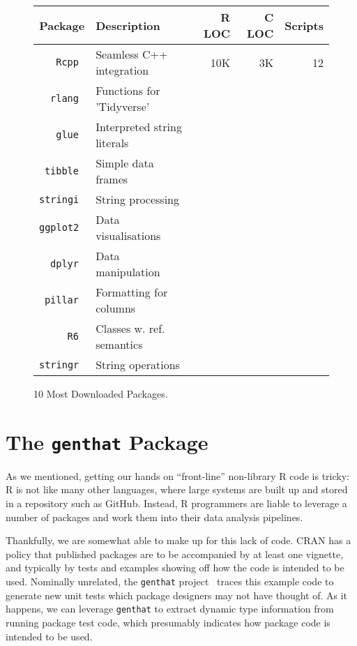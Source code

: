\documentclass[acmsmall,10pt,review,anonymous]{acmart}\settopmatter{printfolios=true,printccs=false,printacmref=false}
\begin{document}
\begin{figure}[!th]{\footnotesize\begin{tabular}{@{}r||l|r|r|r@{}}\hline
\bf Package & \bf Description & \bf R LOC &\bf C LOC &\bf Scripts\\\hline
\tt Rcpp  & Seamless C++ integration & 10K & 3K & 12 \\
\tt rlang & Functions for 'Tidyverse'&&& \\
\tt glue  & Interpreted string literals&&& \\
\tt tibble & Simple data frames&& &\\
\tt stringi &  String processing &&& \\
\tt ggplot2 & Data visualisations&& &\\
\tt dplyr  &  Data manipulation&&& \\
\tt pillar & Formatting for columns&&& \\
\tt R6 & Classes w. ref. semantics&&& \\
\tt stringr & String operations&&& \\
\end{tabular}}\caption{10 Most Downloaded Packages.}\label{most}
\end{figure}

%
%
%
%
\section{The \texttt{genthat} Package}
\label{sec:genthat}

As we mentioned, getting our hands on ``front-line'' non-library R code is tricky: 
R is not like many other languages, where large systems are built up and stored in a repository such as GitHub.  
Instead, R programmers are liable to leverage a number of packages and work them into their data analysis pipelines.

Thankfully, we are somewhat able to make up for this lack of code.
CRAN has a policy that published packages are to be accompanied by at least one vignette, and typically by tests and examples showing off how the code is intended to be used.  
Nominally unrelated, the {\tt genthat} project~\cite{issta18} traces this example code to generate new unit tests which package designers may not have thought of.
As it happens, we can leverage {\tt genthat} to extract dynamic type information from running package test code, which presumably indicates how package code is intended to be used.

\end{document}
